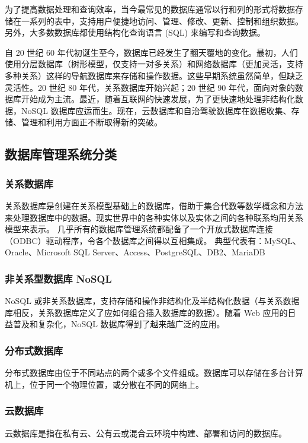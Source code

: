 \documentclass[a4paper,12pt]{article}
\begin{document}
为了提高数据处理和查询效率，当今最常见的数据库通常以行和列的形式将数据存储在一系列的表中，支持用户便捷地访问、管理、修改、更新、控制和组织数据。另外，大多数数据库都使用结构化查询语言 (SQL) 来编写和查询数据。

自 20 世纪 60 年代初诞生至今，数据库已经发生了翻天覆地的变化。最初，人们使用分层数据库（树形模型，仅支持一对多关系）和网络数据库（更加灵活，支持多种关系）这样的导航数据库来存储和操作数据。这些早期系统虽然简单，但缺乏灵活性。20 世纪 80 年代，关系数据库开始兴起；20 世纪 90 年代，面向对象的数据库开始成为主流。最近，随着互联网的快速发展，为了更快速地处理非结构化数据，NoSQL 数据库应运而生。现在，云数据库和自治驾驶数据库在数据收集、存储、管理和利用方面正不断取得新的突破\cite{01}。

\subsection{数据库管理系统分类}

\subsubsection{关系数据库}
关系数据库是创建在关系模型基础上的数据库，借助于集合代数等数学概念和方法来处理数据库中的数据。现实世界中的各种实体以及实体之间的各种联系均用关系模型来表示。
几乎所有的数据库管理系统都配备了一个开放式数据库连接（ODBC）驱动程序，令各个数据库之间得以互相集成。
典型代表有：MySQL、Oracle、Microsoft SQL Server、Access、PostgreSQL、DB2、MariaDB

\subsubsection{非关系型数据库 NoSQL}
NoSQL 或非关系数据库，支持存储和操作非结构化及半结构化数据（与关系数据库相反，关系数据库定义了应如何组合插入数据库的数据）。随着 Web 应用的日益普及和复杂化，NoSQL 数据库得到了越来越广泛的应用。

\subsubsection{分布式数据库}
分布式数据库由位于不同站点的两个或多个文件组成。数据库可以存储在多台计算机上，位于同一个物理位置，或分散在不同的网络上。

\subsubsection{云数据库}
云数据库是指在私有云、公有云或混合云环境中构建、部署和访问的数据库。
\end{document}
